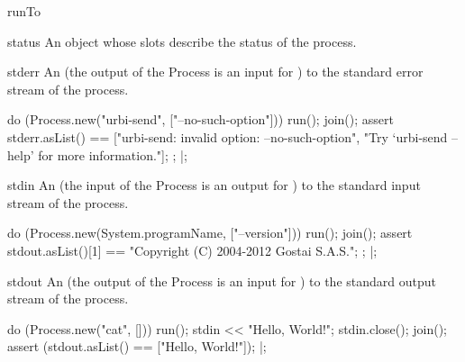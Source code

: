 \begin{urbiscriptapi}
\item[runTo]


\item[status] An object whose slots describe the status of the
  process.


\item[stderr] An  (the output of the Process is
  an input for \urbi) to the standard error stream of the process.
\begin{urbiscript}
do (Process.new("urbi-send", ["--no-such-option"]))
{
  run();
  join();
  assert
  {
    stderr.asList() ==
    ["urbi-send: invalid option: --no-such-option",
     "Try `urbi-send --help' for more information."];
  };
}|;
\end{urbiscript}


\item[stdin] An  (the input of the Process is
  an output for \urbi) to the standard input stream of the process.
\begin{urbiscript}
do (Process.new(System.programName, ["--version"]))
{
  run();
  join();
  assert
  {
    stdout.asList()[1] == "Copyright (C) 2004-2012 Gostai S.A.S.";
  };
}|;
\end{urbiscript}


\item[stdout] An  (the output of the Process is
  an input for \urbi) to the standard output stream of the process.
\begin{urbiscript}
do (Process.new("cat", []))
{
  run();
  stdin << "Hello, World!\n";
  stdin.close();
  join();
  assert (stdout.asList() == ["Hello, World!"]);
}|;
\end{urbiscript}
\end{urbiscriptapi}


